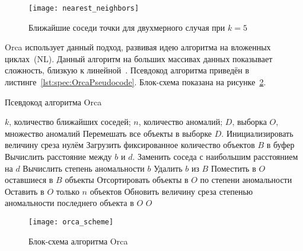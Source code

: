 \begin{figure}
\texttt{[image: nearest\_neighbors]}
\caption{Ближайшие соседи точки для двухмерного случая при $k=5$}
\label{fig:spec:Orca:NearestNeighbor}
\end{figure}

Orca использует данный подход, развивая идею алгоритма на вложенных циклах~(NL). Данный алгоритм на больших массивах данных показывает сложность, близкую к линейной~\cite{BaySchwabacherOrca}. Псевдокод алгоритма приведён в листинге~\ref{lst:spec:OrcaPseudocode}. Блок-схема показана на рисунке~\ref{fig:spec:Orca:Scheme}.

\begin{algorithm}[h!]
\caption{Псевдокод алгоритма Orca}
\label{lst:spec:OrcaPseudocode}
\begin{algorithmic}[1]
\REQUIRE $k$, количество ближайших соседей; $n$, количество аномалий; $D$, выборка
\ENSURE $O$, множество аномалий
\STATE Перемешать все объекты в выборке $D$. \label{lst:spec:OrcaPseudocode:Random}
\STATE Инициализировать величину среза нулём
	\STATE Загрузить фиксированное количество объектов $B$ в буфер
	 \label{lst:spec:OrcaPseudocode:NL}
			\STATE Вычислить расстояние между $b$ и $d$.
				\STATE Заменить соседа с наибольшим расстоянием на $d$
				\STATE Вычислить степень аномальности $b$
				 \label{lst:spec:OrcaPseudocode:Pruning}
					\STATE Удалить $b$ из $B$
				\ENDIF
			\ENDIF
		\ENDFOR
	\ENDFOR
	\STATE Поместить в $O$ оставшиеся в $B$ объекты
	\STATE Отсортировать объекты в $O$ по степени аномальности
	\STATE Оставить в $O$ только $n$ объектов
	\STATE Обновить величину среза степенью аномальности последнего объекта в $O$
\ENDWHILE
\RETURN $O$
\end{algorithmic}
\end{algorithm}

\begin{figure}
\texttt{[image: orca\_scheme]}
\caption{Блок-схема алгоритма Orca}
\label{fig:spec:Orca:Scheme}
\end{figure}

